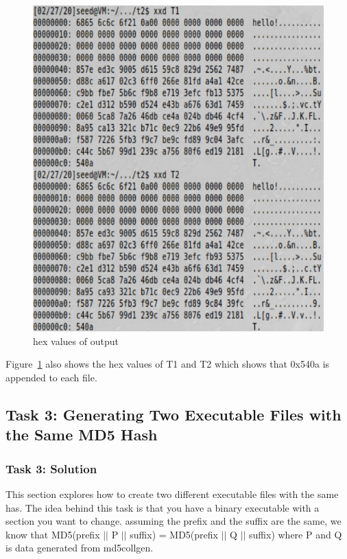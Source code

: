 \documentclass[12pt]{article}
\begin{document}
\begin{figure}[H]
	\begin{center}
		\includegraphics[scale=0.65]{pics/t2p2.png}
	\end{center}{}
	\caption{hex values of output}
	\label{fig:t2p2}
\end{figure}
 
Figure~\ref{fig:t2p2} also shows the hex values of T1 and T2 which shows that 0x540a is appended to each file.

\subsection{Task 3: Generating Two Executable Files with the Same MD5 Hash}
\subsubsection{Task 3: Solution}

This section explores how to create two different executable files with the same has. The idea behind this task is that you have a binary executable with a section you want to change. assuming the prefix and the suffix are the same, we know that MD5(prefix $||$ P $||$ suffix) = MD5(prefix $||$ Q $||$ suffix) where P and Q is data generated from md5collgen.
\end{document}
